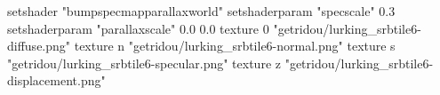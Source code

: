 setshader "bumpspecmapparallaxworld"
setshaderparam "specscale" 0.3
setshaderparam "parallaxscale" 0.0 0.0
texture 0 "getridou/lurking_srbtile6-diffuse.png"
texture n "getridou/lurking_srbtile6-normal.png"
texture s "getridou/lurking_srbtile6-specular.png"
texture z "getridou/lurking_srbtile6-displacement.png"